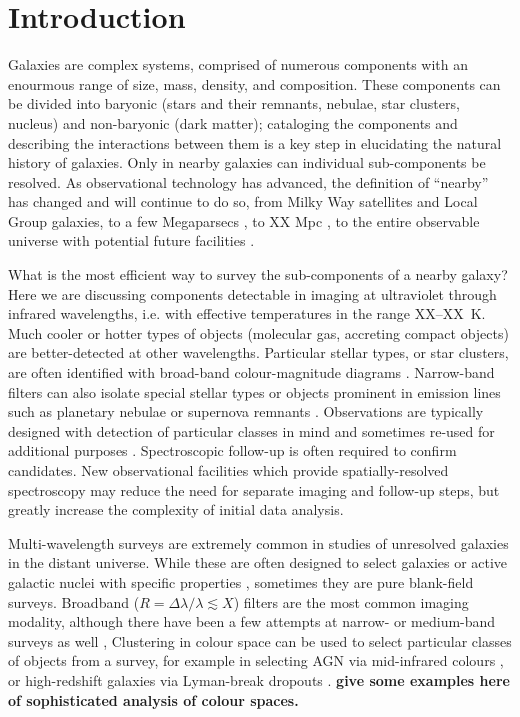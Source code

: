 
\section{Introduction}


Galaxies are complex systems, comprised of numerous components with an enourmous range of size,
mass, density, and composition.
These components can be divided into baryonic (stars and their remnants,
nebulae, star clusters, nucleus) and non-baryonic (dark matter);
cataloging the components and describing
the interactions between them is a key step in elucidating the natural history of galaxies.
Only in nearby galaxies can individual sub-components be resolved.
As observational technology has advanced,
the definition of ``nearby'' has changed and will continue to do so, from Milky Way satellites and Local Group galaxies, to a few
Megaparsecs \citep[distance at which stars can be resolved with HST][]{},
to XX Mpc \citep[distance at which stars can be resolved with JWST][]{},
to the entire observable universe with potential future facilities \citep{}.

What is the most efficient way to survey the sub-components of a nearby galaxy?
Here we are discussing components detectable in imaging at ultraviolet through infrared wavelengths,
i.e. with effective temperatures in the range XX--XX~K.
Much cooler or hotter types of objects (molecular gas, accreting compact objects) are better-detected at other wavelengths.
Particular stellar types, or star clusters, are often identified with broad-band colour-magnitude diagrams \citep[e.g.][]{}.
Narrow-band filters can also isolate special stellar types \citep[e.g.][]{} or objects prominent in emission
lines such as planetary nebulae or supernova remnants \citep[e.g.][]{}.
Observations are typically designed with detection of particular classes in mind and sometimes re-used for additional purposes \citep[e.g.][]{}.
Spectroscopic follow-up is often required to confirm candidates.
New observational facilities which provide spatially-resolved spectroscopy  \citep[e.g.]{}{} may reduce the need for separate imaging and follow-up steps,
but greatly increase the complexity of initial data analysis.


Multi-wavelength surveys are extremely common in studies of unresolved galaxies in the distant universe.
While these are often designed to select galaxies or active galactic nuclei with specific properties \citep[e.g.][]{},
sometimes they are pure blank-field surveys.
Broadband ($R=\Delta \lambda/\lambda \lesssim X$) filters are the most common imaging modality,
although there have been a few attempts at narrow- or medium-band surveys as well \citep[e.g.][]{combo-17},
Clustering in colour space can be used to select particular classes of objects from a survey,
for example in selecting AGN via mid-infrared colours \citep[e.g.][]{},
or high-redshift galaxies via Lyman-break dropouts \citep[e.g.][]{}. 
{\bf give some examples here of sophisticated analysis of colour spaces.}

